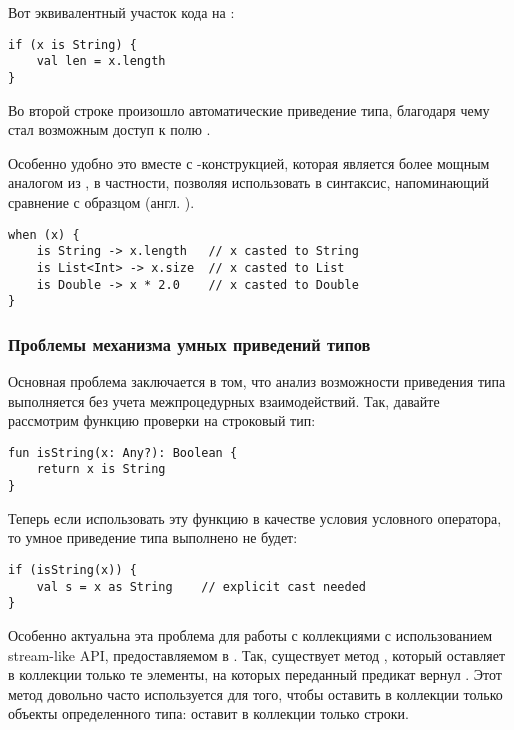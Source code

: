Вот эквивалентный участок кода на :

\begin{verbatim}
if (x is String) {
    val len = x.length
}
\end{verbatim}

Во второй строке произошло автоматические приведение типа, благодаря чему стал возможным доступ к полю .

Особенно удобно это вместе с -конструкцией, которая является более мощным аналогом  из , в частности, позволяя использовать в  синтаксис, напоминающий сравнение с образцом (англ. ).

\begin{verbatim}
when (x) {
    is String -> x.length   // x casted to String
    is List<Int> -> x.size  // x casted to List
    is Double -> x * 2.0    // x casted to Double
}
\end{verbatim}




\subsubsection{Проблемы механизма умных приведений типов}

Основная проблема заключается в том, что анализ возможности приведения типа выполняется без учета межпроцедурных взаимодействий. Так, давайте рассмотрим функцию проверки на строковый тип:

\begin{verbatim}
fun isString(x: Any?): Boolean {
    return x is String
}
\end{verbatim}

Теперь если использовать эту функцию в качестве условия условного оператора, то умное приведение типа выполнено не будет:

\begin{verbatim}
if (isString(x)) {
    val s = x as String    // explicit cast needed
}
\end{verbatim}

Особенно актуальна эта проблема для работы с коллекциями с использованием stream-like API, предоставляемом в . Так, существует метод , который оставляет в коллекции только те элементы, на которых переданный предикат вернул . Этот метод довольно часто используется для того, чтобы оставить в коллекции только объекты определенного типа:  оставит в коллекции  только строки.

